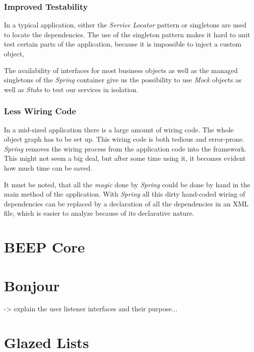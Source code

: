 \subsubsection{Improved Testability}
In a typical application, either the \emph{Service Locator} pattern 
or singletons are used to locate the dependencies. The use of the singleton
pattern makes it hard to unit test certain parts of the
application, because it is impossible to inject a custom object,

The availability of interfaces for most business objects as well as the
managed singletons of the \emph{Spring} container give us the possibility
to use \emph{Mock} objects as well as \emph{Stubs} to test our services
in isolation.

\subsubsection{Less Wiring Code}
In a mid-sized application there is a large amount of wiring code. The whole
object graph has to be set up. This wiring code is both tedious and
error-prone. \emph{Spring} removes the wiring process from the application
code into the framework. This might not seem a big deal, but after some time
using it, it becomes evident how much time can be saved.

It must be noted, that all the \emph{magic} done by \emph{Spring} could be
done by hand in the main method of the application. With \emph{Spring} all
this dirty hand-coded wiring of dependencies can be replaced by a 
declaration of all the dependencies in an XML file, which is easier to
analyze because of its declarative nature.



\section{BEEP Core}


\section{Bonjour}
-> explain the user listener interfaces and their purpose...


\section{Glazed Lists}
\label{appendix_frameworks_glazedlists}
